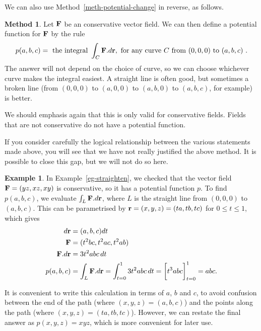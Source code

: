 \documentclass[reqno]{amsart}
\theoremstyle{definition}
\newtheorem{example}[theorem]{Example}
\newtheorem{method}[theorem]{Method}
\begin{document}
We can also use Method~\ref{meth-potential-change} in reverse, as
follows.  
\begin{method}\label{meth-find-potential}
 Let $\mathbf{F}$ be an conservative vector field.  We can then define a
 potential function for $\mathbf{F}$ by the rule
 \[ p(a,b,c) = \text{ the integral } \int_C \mathbf{F}.d\mathbf{r},
     \text{ for any curve $C$ from $(0,0,0)$ to $(a,b,c)$ }.
 \]
 The answer will not depend on the choice of curve, so we can choose
 whichever curve makes the integral easiest.  A straight line is often
 good, but sometimes a broken line (from $(0,0,0)$ to $(a,0,0)$ to
 $(a,b,0)$ to $(a,b,c)$, for example) is better.
\end{method}
We should emphasis again that this is only valid for conservative
fields.  Fields that are not conservative do not have a potential
function.  

If you consider carefully the logical relationship between the various
statements made above, you will see that we have not really justified
the above method.  It is possible to close this gap, but we will not
do so here.

\begin{example}
 In Example~\ref{eg-straighten}, we checked that the vector field
 $\mathbf{F}=(yz,xz,xy)$ is conservative, so it has a potential function $p$.
 To find $p(a,b,c)$, we evaluate $\int_L\mathbf{F}.d\mathbf{r}$, where $L$ is the
 straight line from $(0,0,0)$ to $(a,b,c)$.  This can be parametrised
 by $\mathbf{r}=(x,y,z)=(ta,tb,tc)$ for $0\leq t\leq 1$, which gives
 \begin{align*}
  d\vr &= (a,b,c)dt \\
  \vF &= (t^2bc,t^2ac,t^2ab) \\
  \vF.d\vr &= 3t^2abc\,dt \\
  p(a,b,c) &= \int_L\vF.d\vr = \int_{t=0}^1 3t^2abc\,dt 
             = \CH{t^3abc}_{t=0}^1 = abc.
 \end{align*}

 It is convenient to write this calculation in terms of $a$, $b$ and
 $c$, to avoid confusion between the end of the path (where
 $(x,y,z)=(a,b,c)$) and the points along the path (where
 $(x,y,z)=(ta,tb,tc)$).  However, we can restate the final answer as
 $p(x,y,z)=xyz$, which is more convenient for later use.
\end{example}
\end{document}
